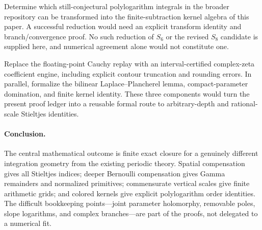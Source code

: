 \begin{question}
Determine which still-conjectural polylogarithm integrals in the broader
repository can be transformed into the finite-subtraction kernel algebra
of this paper. A successful reduction would need an explicit transform
identity and branch/convergence proof. No such reduction of $S_6$ or the
revised $S_8$ candidate is supplied here, and numerical agreement alone
would not constitute one.
\end{question}

\begin{question}
Replace the floating-point Cauchy replay with an interval-certified
complex-zeta coefficient engine, including explicit contour truncation
and rounding errors. In parallel, formalize the bilinear
Laplace--Plancherel lemma, compact-parameter domination, and finite kernel
identity. These three components would turn the present proof ledger
into a reusable formal route to arbitrary-depth and rational-scale
Stieltjes identities.
\end{question}

\paragraph{Conclusion.}
The central mathematical outcome is finite exact closure for a genuinely
different integration geometry from the existing periodic theory. Spatial
compensation gives all Stieltjes indices; deeper Bernoulli compensation
gives Gamma remainders and normalized primitives; commensurate vertical
scales give finite arithmetic grids; and colored kernels give explicit
polylogarithm order identities. The difficult bookkeeping points---joint
parameter holomorphy, removable poles, slope logarithms, and complex
branches---are part of the proofs, not delegated to a numerical fit.
